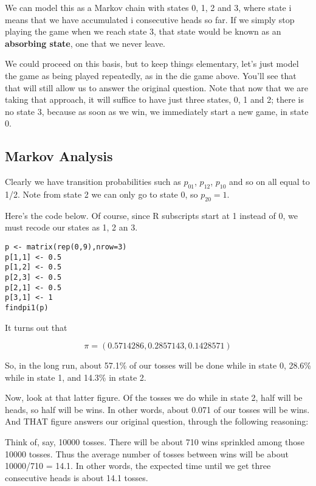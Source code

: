 We can model this as a Markov chain with states 0, 1, 2 and 3, where
state i means that we have accumulated i consecutive heads so far. 
If we simply stop playing the game when we reach state 3, that state
would be known as an {\bf absorbing state}, one that we never leave.

We could proceed on this basis, but to keep things elementary, let's
just model the game as being played repeatedly, as in the die game
above.  You'll see that that will still allow us to answer the original
question.  Note that now that we are taking that approach, it will
suffice to have just three states, 0, 1 and 2; there is no state 3,
because as soon as we win, we immediately start a new game, in state 0.

\subsection{Markov Analysis}
\label{markovanalysis}

Clearly we have transition probabilities such as $p_{01}$, $p_{12}$,
$p_{10}$ and so on all equal to 1/2.  Note from state 2 we can only go
to state 0, so $p_{20} = 1$.

Here's the code below.  Of course, since R subscripts start at 1 instead
of 0, we must recode our states as 1, 2 an 3.

\label{codesnippets}
\begin{Verbatim}[fontsize=\relsize{-2}]
p <- matrix(rep(0,9),nrow=3)
p[1,1] <- 0.5
p[1,2] <- 0.5
p[2,3] <- 0.5
p[2,1] <- 0.5
p[3,1] <- 1
findpi1(p)
\end{Verbatim}

It turns out that

\begin{equation}
\label{pi57}
\pi = (0.5714286, 0.2857143, 0.1428571)
\end{equation}

So, in the long run, about 57.1\% of our tosses will be done while in state
0, 28.6\% while in state 1, and 14.3\% in state 2.

Now, look at that latter figure.  Of the tosses we do while in state 2,
half will be heads, so half will be wins.  In other words, about 0.071
of our tosses will be wins.  And THAT figure answers our original
question, through the following reasoning:

Think of, say, 10000 tosses.  There will be about 710 wins sprinkled
among those 10000 tosses.  Thus the average number of tosses between wins
will be about 10000/710 = 14.1.  In other words, the expected time until
we get three consecutive heads is about 14.1 tosses.

